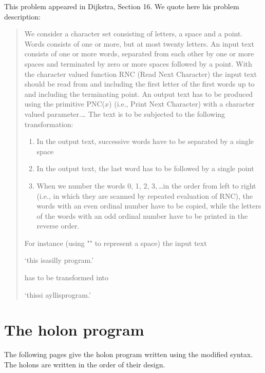 \documentclass[openany,nobib]{tufte-book}
\begin{document}
This problem appeared in Dijkstra, Section 16.\autocite{Dijkstra1970-ja} We
quote here his problem description:
\begin{quotation}
    We consider a character set consisting of letters, a space and a point.
Words consists of one or more, but at most twenty letters. An input text
consists of one or more words, separated from each other by one or more spaces
and terminated by zero or more spaces followed by a point. With the character
valued function RNC (Read Next Character) the input text should be read from
and including the first letter of the first words up to and including the
terminating point. An output text has to be produced using the primitive
PNC($x$) (i.e., Print Next Character) with a character valued parameter.\dots
The text is to be subjected to the following transformation:
    \begin{enumerate}
        \item In the output text, successive words have to be separated by a
single space
        \item In the output text, the last word has to be followed by a single
point
        \item When we number the words 0, 1, 2, 3,\,\dots in the order from
left to right (i.e., in which they are scanned by repeated evaluation of RNC),
the words with an even ordinal number have to be copied, while the letters of
the words with an odd ordinal number have to be printed in the reverse order.
    \end{enumerate}
    For instance (using "\textvisiblespace" to represent a space) the input
text

    \smallskip
    \-\hspace{0.1cm}`this\textvisiblespace \textvisiblespace \textvisiblespace
is\textvisiblespace \textvisiblespace a\textvisiblespace silly\textvisiblespace
\textvisiblespace program\textvisiblespace \textvisiblespace.'

    \smallskip\noindent
    has to be transformed into

    \smallskip
    \-\hspace{0.1cm}`this\textvisiblespace si\textvisiblespace
a\textvisiblespace yllis\textvisiblespace program.'
\end{quotation}

\section{The holon program}

The following pages give the holon program written using the modified syntax.
The holons are written in the order of their design.\clearpage
\end{document}

